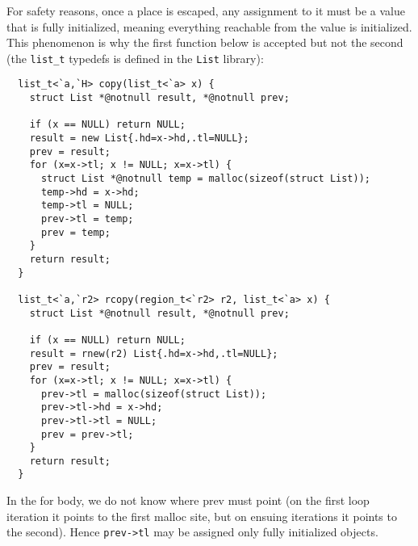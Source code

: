 For safety reasons, once a place is escaped, any assignment to it must
be a value that is fully initialized, meaning everything reachable
from the value is initialized. This phenomenon is why the first
function below is accepted but not the second (the \texttt{list_t}
typedefs is defined in the \texttt{List} library):
\begin{verbatim}
  list_t<`a,`H> copy(list_t<`a> x) {
    struct List *@notnull result, *@notnull prev;

    if (x == NULL) return NULL;
    result = new List{.hd=x->hd,.tl=NULL};
    prev = result;
    for (x=x->tl; x != NULL; x=x->tl) {
      struct List *@notnull temp = malloc(sizeof(struct List));
      temp->hd = x->hd;
      temp->tl = NULL;
      prev->tl = temp;
      prev = temp;
    }
    return result;
  }  

  list_t<`a,`r2> rcopy(region_t<`r2> r2, list_t<`a> x) {
    struct List *@notnull result, *@notnull prev;

    if (x == NULL) return NULL;
    result = rnew(r2) List{.hd=x->hd,.tl=NULL};
    prev = result;
    for (x=x->tl; x != NULL; x=x->tl) {
      prev->tl = malloc(sizeof(struct List));
      prev->tl->hd = x->hd;
      prev->tl->tl = NULL;
      prev = prev->tl;
    }
    return result;
  }  

\end{verbatim}

In the for body, we do not know where prev must point (on the first
loop iteration it points to the first malloc site, but on ensuing
iterations it points to the second).  Hence \texttt{prev->tl} may be
assigned only fully initialized objects.

